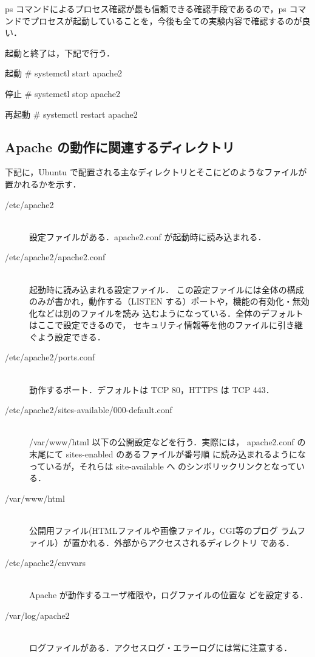 ps コマンドによるプロセス確認が最も信頼できる確認手段であるので，ps コマンドでプロセスが起動していることを，今後も全ての実験内容で確認するのが良い．

起動と終了は，下記で行う．

\begin{cli}
起動
# systemctl start apache2

停止
# systemctl stop apache2

再起動
# systemctl restart apache2
\end{cli}

\subsection{Apache の動作に関連するディレクトリ}

下記に，Ubuntu で配置される主なディレクトリとそこにどのようなファイルが置かれるかを示す．

\begin{description}
 \item[/etc/apache2] \ \\
            設定ファイルがある．apache2.conf が起動時に読み込まれる．
 \item[/etc/apache2/apache2.conf] \ \\ 起動時に読み込まれる設定ファイル．
	    この設定ファイルには全体の構成のみが書かれ，動作する（LISTEN
            する）ポートや，機能の有効化・無効化などは別のファイルを読み
            込むようになっている．全体のデフォルトはここで設定できるので，
	    セキュリティ情報等を他のファイルに引き継ぐよう設定できる．
 \item[/etc/apache2/ports.conf]  \ \\ 動作するポート．デフォルトは TCP
	    80，HTTPS は TCP 443．
 \item[/etc/apache2/sites-available/000-default.conf] \ \\
	    /var/www/html 以下の公開設定などを行う．実際には，
	    apache2.conf の末尾にて sites-enabled のあるファイルが番号順
	    に読み込まれるようになっているが，それらは site-available へ
	    のシンボリックリンクとなっている．
 \item[/var/www/html] \ \\
            公開用ファイル(HTMLファイルや画像ファイル，CGI等のプログ
	    ラムファイル）が置かれる．外部からアクセスされるディレクトリ
	    である．
 \item[/etc/apache2/envvars] \ \\ Apache が動作するユーザ権限や，ログファイルの位置な
	    どを設定する．
 \item[/var/log/apache2] \ \\
            ログファイルがある．アクセスログ・エラーログには常に注意する．
\end{description}

